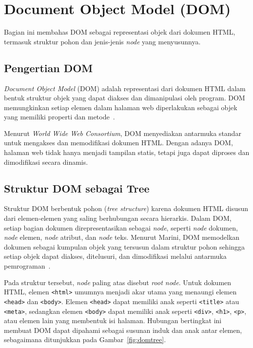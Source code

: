 \section{Document Object Model (DOM)}
\label{sec:dom}
Bagian ini membahas DOM sebagai representasi objek dari dokumen HTML, termasuk struktur pohon dan jenis-jenis \textit{node} yang menyusunnya.

 \subsection{Pengertian DOM}
\textit{Document Object Model }(DOM) adalah representasi dari dokumen HTML dalam bentuk struktur objek yang dapat diakses dan dimanipulasi oleh program. DOM memungkinkan setiap elemen dalam halaman web diperlakukan sebagai objek yang memiliki properti dan metode~\cite{marini:02:thedom}.

Menurut \textit{World Wide Web Consortium}, DOM menyediakan antarmuka standar untuk mengakses dan memodifikasi dokumen HTML. Dengan adanya DOM, halaman web tidak hanya menjadi tampilan statis, tetapi juga dapat diproses dan dimodifikasi secara dinamis.

\subsection{Struktur DOM sebagai Tree}
Struktur DOM berbentuk pohon (\textit{tree structure}) karena dokumen HTML disusun dari elemen-elemen yang saling berhubungan secara hierarkis. Dalam DOM, setiap bagian dokumen direpresentasikan sebagai \textit{node}, seperti \textit{node} dokumen, \textit{node} elemen, \textit{node} atribut, dan \textit{node} teks. Menurut Marini, DOM memodelkan dokumen sebagai kumpulan objek yang tersusun dalam struktur pohon sehingga setiap objek dapat diakses, ditelusuri, dan dimodifikasi melalui antarmuka pemrograman~\cite{marini:02:thedom}.

Pada struktur tersebut, \textit{node} paling atas disebut \textit{root node}. Untuk dokumen HTML, elemen \texttt{<html>} umumnya menjadi akar utama yang menaungi elemen \texttt{<head>} dan \texttt{<body>}. Elemen \texttt{<head>} dapat memiliki anak seperti \texttt{<title>} atau \texttt{<meta>}, sedangkan elemen \texttt{<body>} dapat memiliki anak seperti \texttt{<div>}, \texttt{<h1>}, \texttt{<p>}, atau elemen lain yang membentuk isi halaman. Hubungan bertingkat ini membuat DOM dapat dipahami sebagai susunan induk dan anak antar elemen, sebagaimana ditunjukkan pada Gambar~\ref{fig:domtree}.

